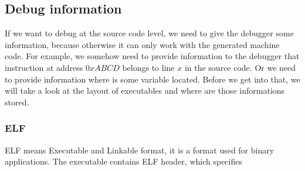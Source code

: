 \subsection{Debug information}
If we want to debug at the source code level, we need to give the debugger some
information, because otherwise it can only work with the generated machine
code. For example, we somehow need to provide information to the debugger that
instruction at address $0xABCD$ belongs to line $x$ in the source code. Or we
need to provide information where is some variable located. Before we get into
that, we will take a look at the layout of executables and where are those
informations stored.

\subsubsection{ELF}
ELF means Executable and Linkable format, it is a format used for binary applications.
The executable contains ELF header, which specifies 
